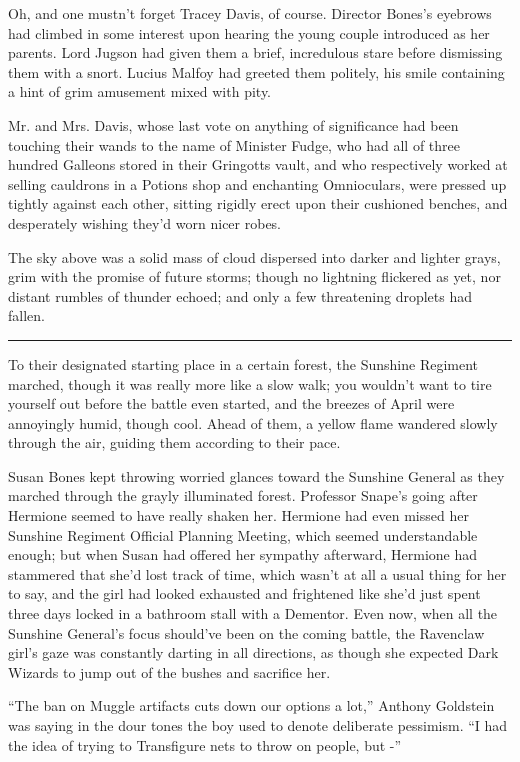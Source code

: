 Oh, and one mustn't forget Tracey Davis, of course. Director Bones's
eyebrows had climbed in some interest upon hearing the young couple
introduced as her parents. Lord Jugson had given them a brief,
incredulous stare before dismissing them with a snort. Lucius Malfoy had
greeted them politely, his smile containing a hint of grim amusement
mixed with pity.

Mr. and Mrs. Davis, whose last vote on anything of significance had been
touching their wands to the name of Minister Fudge, who had all of three
hundred Galleons stored in their Gringotts vault, and who respectively
worked at selling cauldrons in a Potions shop and enchanting
Omnioculars, were pressed up tightly against each other, sitting rigidly
erect upon their cushioned benches, and desperately wishing they'd worn
nicer robes.

The sky above was a solid mass of cloud dispersed into darker and
lighter grays, grim with the promise of future storms; though no
lightning flickered as yet, nor distant rumbles of thunder echoed; and
only a few threatening droplets had fallen.

\begin{center}\rule{3in}{0.4pt}\end{center}

To their designated starting place in a certain forest, the Sunshine
Regiment marched, though it was really more like a slow walk; you
wouldn't want to tire yourself out before the battle even started, and
the breezes of April were annoyingly humid, though cool. Ahead of them,
a yellow flame wandered slowly through the air, guiding them according
to their pace.

Susan Bones kept throwing worried glances toward the Sunshine General as
they marched through the grayly illuminated forest. Professor Snape's
going after Hermione seemed to have really shaken her. Hermione had even
missed her Sunshine Regiment Official Planning Meeting, which seemed
understandable enough; but when Susan had offered her sympathy
afterward, Hermione had stammered that she'd lost track of time, which
wasn't at all a usual thing for her to say, and the girl had looked
exhausted and frightened like she'd just spent three days locked in a
bathroom stall with a Dementor. Even now, when all the Sunshine
General's focus should've been on the coming battle, the Ravenclaw
girl's gaze was constantly darting in all directions, as though she
expected Dark Wizards to jump out of the bushes and sacrifice her.

``The ban on Muggle artifacts cuts down our options a lot,'' Anthony
Goldstein was saying in the dour tones the boy used to denote deliberate
pessimism. ``I had the idea of trying to Transfigure nets to throw on
people, but -''

